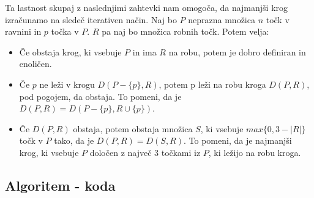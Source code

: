\documentclass[a4paper]{article}
\begin{document}
Ta lastnost skupaj z naslednjimi zahtevki nam omogoča, da najmanjši krog izračunamo na sledeč iterativen način.
Naj bo $P$ neprazna množica $n$ točk v ravnini in $p$ točka v $P$. $R$ pa naj bo množica  robnih točk. 
Potem velja:

\begin{itemize}
\item Če obstaja krog, ki vsebuje $P$ in ima $R$ na robu, potem je dobro definiran in enoličen.
\item Če $p$ ne leži v krogu $D(P - \{p\},R)$, potem p leži na robu kroga $D(P,R)$, pod pogojem, da obstaja. To pomeni, da je $D(P,R) = D(P - \{p\}, R \cup \{p\})$.
\item Če $D(P,R)$ obstaja, potem obstaja množica $S$, ki vsebuje $max\{0, 3 - |R|\}$ točk v $P$ tako, da je $D(P,R) = D(S,R)$. To pomeni, da je najmanjši krog, ki vsebuje $P$ določen z največ 3 točkami iz $P$, ki ležijo na robu kroga.
\end{itemize}


\subsection{Algoritem - koda}
\end{document}
